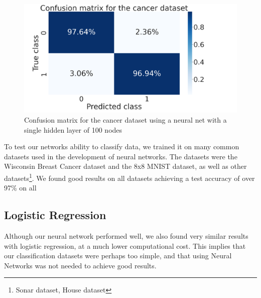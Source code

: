\documentclass[onecolumn,10pt,cleanfoot]{asme2ej}
\begin{document}
\begin{figure}[h]
\centerline{\includegraphics[width=5in]{figure/cancerconf.png}}
\caption{Confusion matrix for the cancer dataset using a neural net with a single hidden layer of 100 nodes}
\label{verification}
\end{figure}

To test our networks ability to classify data, we trained it on many common datasets used in the development of neural networks. The datasets were the Wisconsin Breast Cancer dataset and the 8x8 MNIST dataset, as well as other datasets\footnote{Sonar dataset, House dataset}. We found good results on all datasets achieving a test accuracy of over 97\% on all 

\subsection{Logistic Regression}

Although our neural network performed well, we also found very similar results with logistic regression, at a much lower computational cost. This implies that our classification datasets were perhaps too simple, and that using Neural Networks was not needed to achieve good results.

\end{document}
